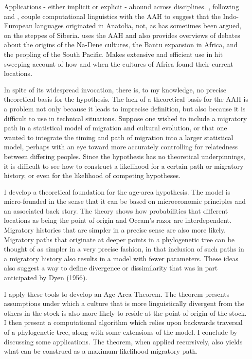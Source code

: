 \documentclass[11pt]{article}
\begin{document}
Applications - either implicit or explicit  - abound across disciplines. \cite{atkinson03}, following \cite{renfrew87} and \cite{dogolpolsky88}, couple computational linguistics with the AAH to suggest that the Indo-European languages originated in Anatolia, not, as has sometimes been argued, on the steppes of Siberia. \cite{ruhlen94} uses the AAH and also provides overviews of debates about the origins of the Na-Dene cultures, the Bantu expansion in Africa, and the peopling of the South Pacific. \cite{ehret01} Makes extensive and efficient use in hit sweeping account of how and when the cultures of Africa found their current locations.

In spite of its widespread invocation, there is, to my knowledge, no precise theoretical basis for the hypothesis. The lack of a theoretical basis for the  AAH is a problem not only because it leads to imprecise definition, but also because it is difficult to use in technical situations. Suppose one wished to include a migratory path in a statistical model of migration and cultural evolution, or that one wanted to integrate the timing and path of migration into a larger statistical model, perhaps with an eye toward more accurately controlling for relatedness between differing peoples. Since the hypothesis has no theoretical underpinnings, it is difficult to see how to construct a likelihood for a certain path or migratory history, or even for the likelihood of competing hypotheses.

I develop a theoretical foundation for the age-area hypothesis. The model is micro-founded in the sense that it can be based on microeconomic principles and an associated back story. The theory shows how probabilities that different locations as being the point of origin and Occam's razor are interdependent. Migratory histories that are simpler in a precise sense are also more likely. Migratory paths that originate at deeper points in a phylogenetic tree can be thought of as simpler in a very precise fashion, in that inclusion of such paths in a migratory history also results in a model with fewer parameters. These ideas also suggest a way to define divergence or dissimilarity that was in part anticipated by Dyen (1956). 

I apply these tools to develop an Age-Area Theorem. The theorem presents assumptions under which a culture that is more linguistically divergent from the others in the stock is also more likely to reside at the point of origin of the stock. I then present a computational algorithm which relies upon backwards traversal of a phylogenetic tree, along with some extensions of the model. I conclude by discussing some applications. The theorem, when applied recursively, also yields what can be construed as a maximum-likelihood migratory path. 
\end{document}
